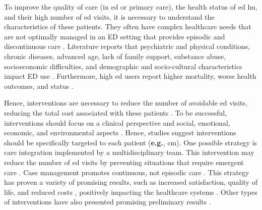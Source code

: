 \documentclass{bmcart}
\begin{document}
\par To improve the quality of care (in \gls{ed} or primary care), the health status of \gls{ed} \gls{hu}, and their high number of \gls{ed} visits, it is necessary to understand the characteristics of these patients. 
They often have complex healthcare needs that are not optimally managed in an ED setting that provides episodic and discontinuous care \cite{abello_care_2012, soril_reducing_2015, mandelberg_epidemiologic_2000, sun_predictors_2003, okin_effects_2000}. 
Literature reports that psychiatric and physical conditions, chronic diseases, advanced age, lack of family support, substance abuse, socioeconomic difficulties, and demographic and socio-cultural characteristics impact ED use \cite{abello_care_2012, bodenmann_case_2017, chiu_statistical_2019, hudon_effectiveness_2016, moe_effectiveness_2017, navratil-strawn_emergency_2014, van_den_heede_interventions_2016, shumway_cost-effectiveness_2008, ruger_analysis_2004, frost_using_2017, sun_predictors_2003, lee_utilization_2007, doupe_frequent_2012}.
Furthermore, high \gls{ed} users report higher mortality, worse health outcomes, and status \cite{moe_effectiveness_2017, ruger_analysis_2004, sun_predictors_2003, chan_frequent_2002, blank_descriptive_2005}.
\par Hence, interventions are necessary to reduce the number of avoidable \gls{ed} visits, reducing the total cost associated with these patients \cite{frost_using_2017, kumar_effectiveness_2013}.
To be successful, interventions should focus on a clinical perspective and social, emotional, economic, and environmental aspects \cite{grimmer-somers_holistic_2010}.
Hence, studies suggest interventions should be specifically targeted to each patient (\textbf{e.g.}, \gls{cm}).
One possible strategy is care integration implemented by a multidisciplinary team. 
This intervention may reduce the number of \gls{ed} visits by preventing situations that require emergent care \cite{hudon_effectiveness_2016, moe_effectiveness_2017, navratil-strawn_emergency_2014, soril_reducing_2015}.
Case management promotes continuous, not episodic care \cite{kumar_effectiveness_2013}. 
This strategy has proven a variety of promising results, such as increased satisfaction, quality of life, and reduced costs \cite{hudon_effectiveness_2016, shumway_cost-effectiveness_2008}, positively impacting the healthcare systems \cite{kumar_effectiveness_2013}. 
Other types of interventions have also presented promising preliminary results \cite{shumway_cost-effectiveness_2008}.
\end{document}
